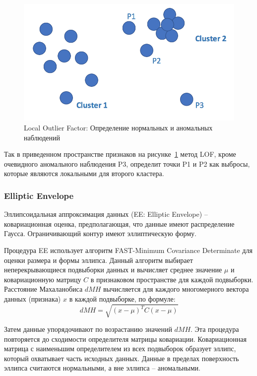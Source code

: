 \documentclass[12pt]{article}
\begin{document}
    \begin{figure}[h!]
        \centering
        \includegraphics[width=0.6\linewidth]{LocalOutlierFactor.png}
        \caption{Local Outlier Factor: Определение нормальных и аномальных наблюдений}
        \label{sec:Research:Model:LocalOutlierFactor:fig:LocalOutlierFactor}
    \end{figure}

    \par Так в приведенном пространстве признаков на рисунке~\ref{sec:Research:Model:LocalOutlierFactor:fig:LocalOutlierFactor} метод LOF, кроме очевидного аномального наблюдения P3, определит точки P1 и P2 как выбросы, которые являются локальными для второго кластера.


    \subsubsection{Elliptic Envelope}
    \label{sec:Research:Model:EllipticEnvelope}

    \par Эллипсоидальная аппроксимация данных (EE: Elliptic Envelope) \cite{EE} -- ковариационная оценка, предполагающая, что данные имеют распределение Гаусса. Ограничивающий контур имеют эллиптическую форму.

    \par Процедура EE использует алгоритм FAST-Minimum Covariance Determinate для оценки размера и формы эллипса. Данный алгоритм выбирает неперекрывающиеся подвыборки данных и вычисляет среднее значение $\mu$ и ковариационную матрицу $C$ в признаковом пространстве для каждой подвыборки. Расстояние Махаланобиса $dMH$ вычисляется для каждого многомерного вектора данных (признака) $x$ в каждой подвыборке, по формуле:
    \begin{equation}
    \label{sec:Research:Model:EllipticEnvelope:formula:MahalanobisDistance}
        dMH = \sqrt{(x-\mu)^T C (x-\mu)}
    \end{equation}

    \noindent Затем данные упорядочивают по возрастанию значений $dMH$. Эта процедура повторяется до сходимости определителя матрицы ковариации. Ковариационная матрица с наименьшим определителем из всех подвыборок образует эллипс, который охватывает часть исходных данных. Данные в пределах поверхность эллипса считаются нормальными, а вне эллипса -- аномальными.
\end{document}

